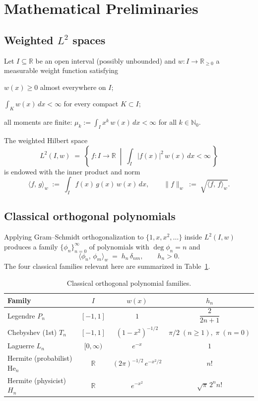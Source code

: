 \documentclass[11pt,a4paper]{article}
\theoremstyle{definition}
\newcommand{\R}{\mathbb{R}}
\newcommand{\N}{\mathbb{N}}
\newcommand{\ipw}[2]{\langle #1,\, #2 \rangle_{w}}
\newcommand{\HE}{\mathrm{He}}
\begin{document}
\section{Mathematical Preliminaries}\label{sec:prelim}

\subsection{Weighted $L^2$ spaces}

Let $I\subseteq\R$ be an open interval (possibly unbounded) and
$w\colon I\to\R_{\ge 0}$ a measurable weight function satisfying
\begin{description}\itemsep0pt
  \item[(W1)] $w(x)\ge 0$ almost everywhere on $I$;
  \item[(W2)] $\int_K w(x)\,dx<\infty$ for every compact $K\subset I$;
  \item[(W3)] all moments are finite:
              $\mu_k := \int_I x^k\,w(x)\,dx<\infty$ for all $k\in\N_0$.
\end{description}

The weighted Hilbert space
\[
  L^2(I,w) \;=\;
  \left\{\, f\colon I\to\R \;\middle|\; \int_I |f(x)|^2\,w(x)\,dx<\infty\,\right\}
\]
is endowed with the inner product and norm
\[
  \ipw{f}{g} \;:=\; \int_I f(x)\,g(x)\,w(x)\,dx,
  \qquad
  \|f\|_w \;:=\; \sqrt{\ipw{f}{f}}.
\]

\subsection{Classical orthogonal polynomials}

Applying Gram--Schmidt orthogonalization to $\{1,x,x^2,\ldots\}$ inside
$L^2(I,w)$ produces a family $\{\phi_n\}_{n=0}^\infty$ of polynomials with
$\deg\phi_n=n$ and
\[
  \ipw{\phi_n}{\phi_m} \;=\; h_n\,\delta_{nm},\qquad h_n>0.
\]
The four classical families relevant here are summarized in
Table~\ref{tab:classical}.

\begin{table}[ht]
\centering
\caption{Classical orthogonal polynomial families.}
\label{tab:classical}
\begin{tabular}{lccc}
\toprule
Family & $I$ & $w(x)$ & $h_n$ \\
\midrule
Legendre  $P_n$            & $[-1,1]$        & $1$
  & $\dfrac{2}{2n+1}$ \\[4pt]
Chebyshev (1st) $T_n$      & $[-1,1]$        & $(1-x^2)^{-1/2}$
  & $\pi/2\;(n\ge1),\;\pi\;(n=0)$ \\[4pt]
Laguerre $L_n$             & $[0,\infty)$    & $e^{-x}$
  & $1$ \\[4pt]
Hermite (probabilist) $\HE_n$ & $\R$         & $(2\pi)^{-1/2}\,e^{-x^2/2}$
  & $n!$ \\[4pt]
Hermite (physicist) $H_n$  & $\R$            & $e^{-x^2}$
  & $\sqrt{\pi}\,2^n n!$ \\
\bottomrule
\end{tabular}
\end{table}
\end{document}
